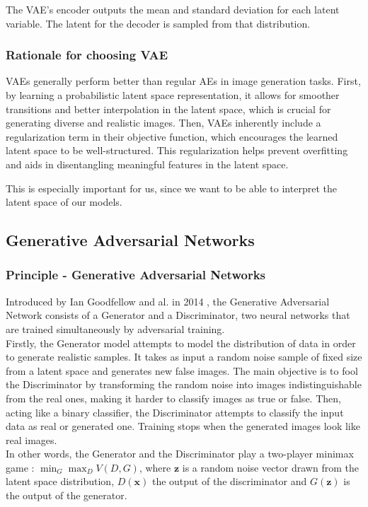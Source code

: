 \documentclass{article}
\begin{document}
The VAE's encoder outputs the mean and standard deviation for each latent variable. The latent for the decoder is sampled from that distribution.

\subsubsection*{Rationale for choosing VAE}
VAEs generally perform better than regular AEs in image generation tasks. 
First, by learning a probabilistic latent space representation, it allows for smoother transitions and better interpolation in the latent space, which is crucial for generating diverse and realistic images. 
Then, VAEs inherently include a regularization term in their objective function, which encourages the learned latent space to be well-structured. 
This regularization helps prevent overfitting and aids in disentangling meaningful features in the latent space.
  
This is especially important for us, since we want to be able to interpret the latent space of our models.


\subsection{Generative Adversarial Networks}

\subsubsection*{Principle - Generative Adversarial Networks}

\quad Introduced by Ian Goodfellow and al. in 2014 \cite{goodfellow2014generative}, the Generative Adversarial Network consists of a Generator and a Discriminator, two neural networks that are trained simultaneously by adversarial training. \\
Firstly, the Generator model attempts to model the distribution of data in order to generate realistic samples. 
It takes as input a random noise sample of fixed size from a latent space and generates new false images. 
The main objective is to fool the Discriminator by transforming the random noise into images indistinguishable from the real ones, making it harder to classify images as true or false. 
Then, acting like a binary classifier, the Discriminator attempts to classify the input data as real or generated one. Training stops when the generated images look like real images.\\

In other words, the Generator and the Discriminator play a two-player minimax game : $\min_G \max_D V(D, G)$, where $\mathbf{z}$ is a random noise vector drawn from the latent space distribution, $D(\mathbf{x})$ the output of the discriminator and $G(\mathbf{z})$ is the output of the generator.\\
\end{document}
